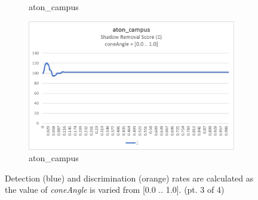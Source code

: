 \begin{appendices}
\begin{figure}
\begin{subfigure}{.45\linewidth}
  \caption{aton\_campus}
\end{subfigure}
\hfill
\begin{subfigure}{.45\linewidth}
  \includegraphics[width=1\linewidth]{figures/appendix/campus_coneAngle_score.jpg}
  \caption{aton\_campus}
\end{subfigure}

\caption{Detection (blue) and discrimination (orange) rates are calculated as the value of \textit{coneAngle} is varied from [0.0 .. 1.0]. (pt. 3 of 4)}
\end{figure}


\end{appendices}
